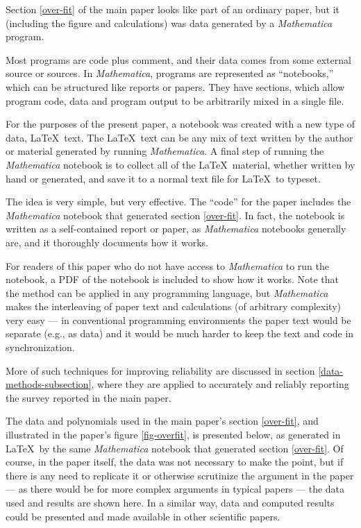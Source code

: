 \documentclass[10pt,a4paper]{article}
\begin{document}

Section \ref{over-fit} of the main paper looks like part of an ordinary paper, but it (including the figure and calculations) was data generated by a \emph{Mathematica\/} program.

Most programs are code plus comment, and their data comes from some external source or sources. In \emph{Mathematica}, programs are represented as ``notebooks,'' which can be structured like reports or papers. They have sections, which allow program code, data and program output to be arbitrarily mixed in a single file.

For the purposes of the present paper, a notebook was created with a new type of data, \LaTeX\ text. The \LaTeX\ text can be any mix of text written by the author or material generated by running \emph{Mathematica}. A final step of running the \emph{Mathematica\/} notebook is to collect all of the \LaTeX\ material, whether written by hand or generated, and save it to a normal text file for \LaTeX\ to typeset. 

The idea is very simple, but very effective. The ``code'' for the paper includes the \emph{Mathematica\/} notebook that generated section \ref{over-fit}. In fact, the notebook is written as a self-contained report or paper, as \emph{Mathematica\/} notebooks generally are, and it thoroughly documents how it works. 

For readers of this paper who do not have access to \emph{Mathematica\/} to run the notebook, a PDF of the notebook is included to show how it works. Note that the method can be applied in any programming language, but \emph{Mathematica\/} makes the interleaving of paper text and calculations (of arbitrary complexity) very easy --- in conventional programming environments the paper text would be separate (e.g., as data) and it would be much harder to keep the text and code in synchronization.

More of such techniques for improving reliability are discussed in section \ref{data-methods-subsection}, where they are applied to accurately and reliably reporting the survey reported in the main paper.

The data and polynomials used in the main paper's section \ref{over-fit}, and illustrated in the paper's figure \ref{fig-overfit}, is presented below, as generated in \LaTeX\ by the same \emph{Mathematica\/} notebook that generated section \ref{over-fit}. Of course, in the paper itself, the data was not necessary to make the point, but if there is any need to replicate it or otherwise scrutinize the argument in the paper --- as there would be for more complex arguments in typical papers --- the data used and results are shown here. In a similar way, data and computed results could be presented and made available in other scientific papers.
\end{document}
